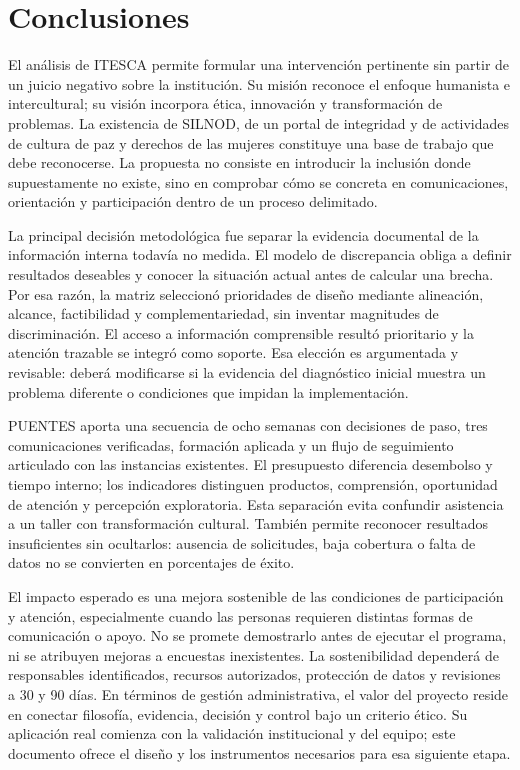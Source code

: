 \documentclass[12pt,letterpaper,oneside]{article}
\begin{document}
\section{Conclusiones}
El análisis de ITESCA permite formular una intervención pertinente sin partir de un juicio negativo sobre la institución. Su misión reconoce el enfoque humanista e intercultural; su visión incorpora ética, innovación y transformación de problemas. La existencia de SILNOD, de un portal de integridad y de actividades de cultura de paz y derechos de las mujeres constituye una base de trabajo que debe reconocerse. La propuesta no consiste en introducir la inclusión donde supuestamente no existe, sino en comprobar cómo se concreta en comunicaciones, orientación y participación dentro de un proceso delimitado.

La principal decisión metodológica fue separar la evidencia documental de la información interna todavía no medida. El modelo de discrepancia obliga a definir resultados deseables y conocer la situación actual antes de calcular una brecha. Por esa razón, la matriz seleccionó prioridades de diseño mediante alineación, alcance, factibilidad y complementariedad, sin inventar magnitudes de discriminación. El acceso a información comprensible resultó prioritario y la atención trazable se integró como soporte. Esa elección es argumentada y revisable: deberá modificarse si la evidencia del diagnóstico inicial muestra un problema diferente o condiciones que impidan la implementación.

PUENTES aporta una secuencia de ocho semanas con decisiones de paso, tres comunicaciones verificadas, formación aplicada y un flujo de seguimiento articulado con las instancias existentes. El presupuesto diferencia desembolso y tiempo interno; los indicadores distinguen productos, comprensión, oportunidad de atención y percepción exploratoria. Esta separación evita confundir asistencia a un taller con transformación cultural. También permite reconocer resultados insuficientes sin ocultarlos: ausencia de solicitudes, baja cobertura o falta de datos no se convierten en porcentajes de éxito.

El impacto esperado es una mejora sostenible de las condiciones de participación y atención, especialmente cuando las personas requieren distintas formas de comunicación o apoyo. No se promete demostrarlo antes de ejecutar el programa, ni se atribuyen mejoras a encuestas inexistentes. La sostenibilidad dependerá de responsables identificados, recursos autorizados, protección de datos y revisiones a 30 y 90 días. En términos de gestión administrativa, el valor del proyecto reside en conectar filosofía, evidencia, decisión y control bajo un criterio ético. Su aplicación real comienza con la validación institucional y del equipo; este documento ofrece el diseño y los instrumentos necesarios para esa siguiente etapa.
\end{document}
